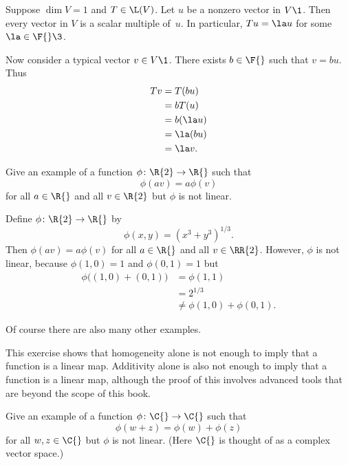 \begin{Solution}
Suppose $\dim V = 1$ and $T \in \L(V)$.  Let $u$ be a nonzero vector in $V\1$.
Then every vector in $V$ is a scalar multiple of~$u$.  In particular, $Tu = \la u$ for
some $\la \in \F{}\3$.

Now consider a typical vector $v \in V\1$.  There exists $b \in \F{}$ such that
$v = bu$.  Thus
\begin{align*}
Tv &= T(bu) \\
&= bT(u) \\
&= b(\la u) \\
&= \la (bu) \\
&= \la v.
\end{align*}
\end{Solution}

\exercise
Give an example of a function $\phi\colon \R{2} \to \R{}$ such that \label{403}
\[
\phi(av) = a \phi(v)
\]
for all $a \in \R{}$ and all $v \in \R{2}$ but $\phi$ is not linear.

\begin{Solution}
Define $\phi \colon \R{2} \to \R{}$ by
\[
\phi(x,y) = (x^3 + y^3)^{1/3}.
\]
Then $\phi(av) = a \phi(v)$ for all $a \in \R{}$ and all $v \in \RR{2}$.  However, $\phi$
is not linear, because $\phi(1,0) = 1$ and $\phi(0,1) = 1$ but
\begin{align*}
\phi\bigl((1,0) + (0,1)\bigr) &= \phi(1,1) \\
&= 2^{1/3} \\
&\ne \phi(1,0) + \phi(0,1).
\end{align*}

Of course there are also many other examples.

\Comment
This exercise shows that homogeneity alone is not
enough to imply that a function is a linear map.  Additivity alone is also not
enough to imply that a function is a linear map, although the proof of this involves
advanced tools that are beyond the scope of this book.
\end{Solution}

\exercise
Give an example of a function $\phi \colon \C{} \to \C{}$ such that
\[
\phi(w + z) = \phi(w) + \phi(z)
\]
for all $w, z \in \C{}$ but $\phi$ is not linear. (Here $\C{}$ is thought of as a complex vector space.)

